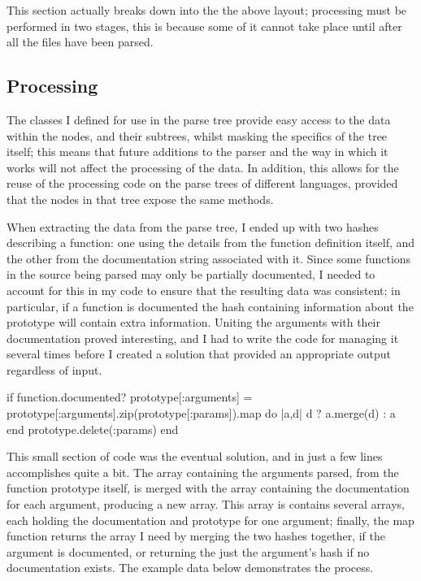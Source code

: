 This section actually breaks down into the the above layout; processing must be
performed in two stages, this is because some of it cannot take place until
after all the files have been parsed.

  \subsection{Processing}
    The classes I defined for use in the parse tree provide easy access to the
    data within the nodes, and their subtrees, whilst masking the specifics of
    the tree itself; this means that future additions to the parser and the way
    in which it works will not affect the processing of the data. In addition,
    this allows for the reuse of the processing code on the parse trees of
    different languages, provided that the nodes in that tree expose the same
    methods.

    When extracting the data from the parse tree, I ended up with two hashes
    describing a function: one using the details from the function definition
    itself, and the other from the documentation string associated with it.
    Since some functions in the source being parsed may only be partially
    documented, I needed to account for this in my code to ensure that the
    resulting data was consistent; in particular, if a function is documented
    the hash containing information about the prototype will contain extra
    information. Uniting the arguments with their documentation proved
    interesting, and I had to write the code for managing it several times
    before I created a solution that provided an appropriate output regardless
    of input.

    \begin{code}[language=ruby, gobble=6]
      if function.documented?
        prototype[:arguments] = prototype[:arguments].zip(prototype[:params]).map do |a,d|
          d ? a.merge(d) : a
        end
        prototype.delete(:params)
      end
    \end{code}

    This small section of code was the eventual solution, and in just a few
    lines accomplishes quite a bit. The array containing the arguments
    parsed, from the function prototype itself, is merged with the array
    containing the documentation for each argument, producing a new array. This
    array is contains several arrays, each holding the documentation and
    prototype for one argument; finally, the map function returns the array I
    need by merging the two hashes together, if the argument is documented, or
    returning the just the argument's hash if no documentation exists. The
    example data below demonstrates the process.

